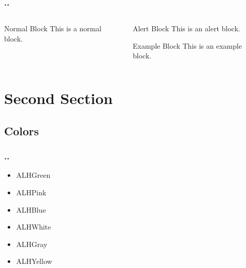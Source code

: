 \documentclass[ignorenonframetext,14pt]{beamer}
\def\wingdsqflr{{\fontspec{Wingdings Regular} v}}
\begin{document}
\begin{frame}
    \frametitle{\insertsectionnumber.\insertsubsectionnumber. \insertsubsectionhead}

    \begin{columns}
        \begin{column}{.5\textwidth}
            \begin{block}{Normal Block}
                This is a normal block.
            \end{block}
        \end{column}
        \begin{column}{.5\textwidth}
            \begin{alertblock}{Alert Block}
                This is an alert block.
            \end{alertblock}
            \begin{exampleblock}{Example Block}
                This is an example block.
            \end{exampleblock}
        \end{column}
    \end{columns}

\end{frame}

\section{Second Section}

\subsection{Colors}

\begin{frame}
    \frametitle{\insertsectionnumber.\insertsubsectionnumber. \insertsubsectionhead}
    \begin{itemize}
        \item[\wingdsqflr] \textcolor{ALHGreen}{ALHGreen}
        \item[\wingdsqflr] \textcolor{ALHPink}{ALHPink}
        \item[\wingdsqflr] \textcolor{ALHBlue}{ALHBlue}
        \item[\wingdsqflr] \textcolor{ALHWhite}{ALHWhite}
        \item[\wingdsqflr] \textcolor{ALHGray}{ALHGray}
        \item[\wingdsqflr] \textcolor{ALHYellow}{ALHYellow}
    \end{itemize}

\end{frame}
\end{document}
